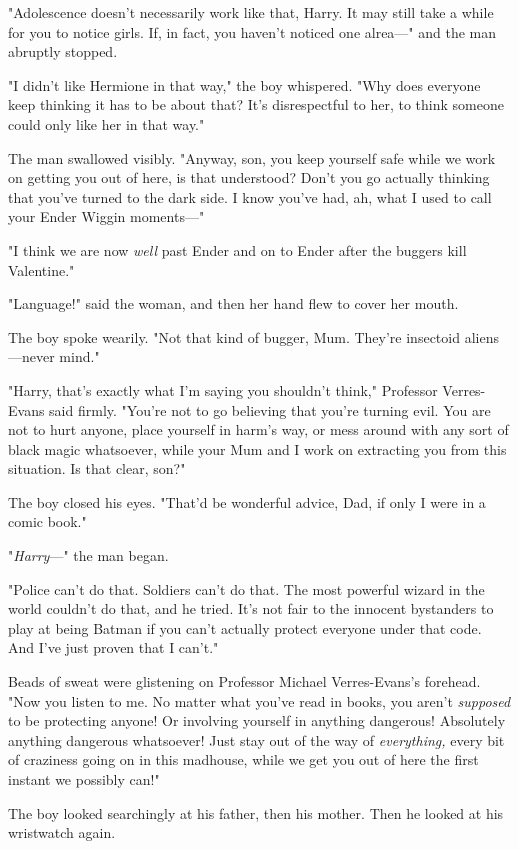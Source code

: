 "Adolescence doesn't necessarily work like that, Harry. It may still take a
while for you to notice girls. If, in fact, you haven't noticed one alrea\mbox{---}" and
the man abruptly stopped.

"I didn't like Hermione in that way," the boy whispered. "Why does everyone
keep thinking it has to be about that? It's disrespectful to her, to think
someone could only like her in that way."

The man swallowed visibly. "Anyway, son, you keep yourself safe while we work
on getting you out of here, is that understood? Don't you go actually thinking
that you've turned to the dark side. I know you've had, ah, what I used to call
your Ender Wiggin moments\mbox{---}"

"I think we are now \emph{well} past Ender and on to Ender after the buggers
kill Valentine."

"Language!" said the woman, and then her hand flew to cover her mouth.

The boy spoke wearily. "Not that kind of bugger, Mum. They're insectoid
aliens---never mind."

"Harry, that's exactly what I'm saying you shouldn't think," Professor
Verres-Evans said firmly. "You're not to go believing that you're turning evil.
You are not to hurt anyone, place yourself in harm's way, or mess around with
any sort of black magic whatsoever, while your Mum and I work on extracting you
from this situation. Is that clear, son?"

The boy closed his eyes. "That'd be wonderful advice, Dad, if only I were in a
comic book."

"\emph{Harry}\mbox{---}" the man began.

"Police can't do that. Soldiers can't do that. The most powerful wizard in the
world couldn't do that, and he tried. It's not fair to the innocent bystanders
to play at being Batman if you can't actually protect everyone under that code.
And I've just proven that I can't."

Beads of sweat were glistening on Professor Michael Verres-Evans's forehead.
"Now you listen to me. No matter what you've read in books, you aren't
\emph{supposed} to be protecting anyone! Or involving yourself in anything
dangerous! Absolutely anything dangerous whatsoever! Just stay out of the way
of \emph{everything,} every bit of craziness going on in this madhouse, while
we get you out of here the first instant we possibly can!"

The boy looked searchingly at his father, then his mother. Then he looked at
his wristwatch again.

